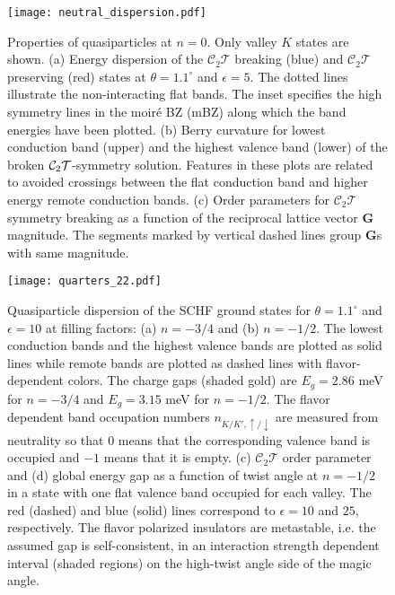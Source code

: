 \documentclass[aps,prl,reprint,amssymb,groupedaddress,twocolumn]{revtex4}
\newcommand{\CT}{$\mathcal{C}_2\mathcal{T}$ }
\begin{document}
\begin{figure}[t]
	\begin{center}
		\centering
		\texttt{[image: neutral\_dispersion.pdf]}
		\caption{Properties of quasiparticles at $n=0$. Only valley $K$ states are shown. 
			(a) Energy dispersion of the \CT breaking (blue) and \CT preserving (red)
			states at $\theta=1.1^{\circ}$ and $\epsilon=5$.
			The dotted lines illustrate the non-interacting flat bands.  
			The inset specifies the high symmetry lines in the moir\'e BZ (mBZ) along which the band energies have been plotted.
			(b) Berry curvature for lowest conduction band (upper) and the highest valence  band (lower) of the broken 
			${\cal C}_{2}{\cal T}$-symmetry solution.  Features in these plots are related to avoided crossings between 
			the flat conduction band and higher energy remote conduction bands. 
			(c) Order parameters for \CT symmetry breaking as a function of the reciprocal lattice 
			vector $\bm{G}$ magnitude.  The segments marked by vertical dashed lines group 
			$\bm{G}$s with same magnitude.} 
	 \label{Neutrality}
	\end{center}
\end{figure}


\begin{figure*}[t]
	\begin{center}
		\centering
		\texttt{[image: quarters\_22.pdf]}
		\caption{Quasiparticle dispersion of the SCHF ground states for $\theta=1.1^{\circ}$ and $\epsilon=10$ at filling factors:
			(a) $n=-3/4$ and  (b) $n=-1/2$.
			The lowest conduction bands and the highest valence bands are plotted as solid lines 
			while remote bands are plotted as dashed lines with flavor-dependent colors.
			The charge gaps (shaded gold) are $E_g=2.86$ meV for $n=-3/4$  and $E_g=3.15$ meV for $n=-1/2$.
			The flavor dependent band occupation numbers $n_{K/K',\uparrow/\downarrow}$ are measured from neutrality so that 
			$0$ means that the corresponding valence band is occupied and $-1$ means that it is 
			empty. 
			(c)  \CT order parameter and (d) global energy gap as a function of twist angle at $n=-1/2$ in a state with 
			one flat valence band occupied for each valley. 
			The red (dashed) and blue (solid) lines correspond to $\epsilon=10$ and $25$, respectively.
			The flavor polarized insulators are metastable, i.e. the assumed gap is self-consistent,
			in an interaction strength dependent interval (shaded regions) 
			 on the high-twist angle side of the magic angle.}
		\label{MultipleFlavorDispersion}
	\end{center}
\end{figure*}
\end{document}

